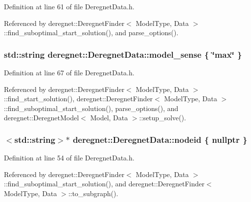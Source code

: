 Definition at line 61 of file Deregnet\+Data.\+h.



Referenced by deregnet\+::\+Deregnet\+Finder$<$ Model\+Type, Data $>$\+::find\+\_\+suboptimal\+\_\+start\+\_\+solution(), and parse\+\_\+options().

\subsubsection[{\texorpdfstring{model\+\_\+sense}{model_sense}}]{\setlength{\rightskip}{0pt plus 5cm}std\+::string deregnet\+::\+Deregnet\+Data\+::model\+\_\+sense \{ \char`\"{}max\char`\"{} \}}\hypertarget{classderegnet_1_1DeregnetData_ac3918536b5423facf0ac155997703c52}{}\label{classderegnet_1_1DeregnetData_ac3918536b5423facf0ac155997703c52}


Definition at line 67 of file Deregnet\+Data.\+h.



Referenced by deregnet\+::\+Deregnet\+Finder$<$ Model\+Type, Data $>$\+::find\+\_\+start\+\_\+solution(), deregnet\+::\+Deregnet\+Finder$<$ Model\+Type, Data $>$\+::find\+\_\+suboptimal\+\_\+start\+\_\+solution(), parse\+\_\+options(), and deregnet\+::\+Deregnet\+Model$<$ Model, Data $>$\+::setup\+\_\+solve().

\subsubsection[{\texorpdfstring{nodeid}{nodeid}}]{$<$std\+::string$>$$\ast$ deregnet\+::\+Deregnet\+Data\+::nodeid \{ nullptr \}}\hypertarget{classderegnet_1_1DeregnetData_a3b57d7ed19c104c7fe257e17f0d2cfb5}{}\label{classderegnet_1_1DeregnetData_a3b57d7ed19c104c7fe257e17f0d2cfb5}


Definition at line 54 of file Deregnet\+Data.\+h.



Referenced by deregnet\+::\+Deregnet\+Finder$<$ Model\+Type, Data $>$\+::find\+\_\+suboptimal\+\_\+start\+\_\+solution(), and deregnet\+::\+Deregnet\+Finder$<$ Model\+Type, Data $>$\+::to\+\_\+subgraph().

